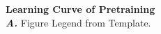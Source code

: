 \caption{\textbf{
Learning Curve of Pretraining
}
\smallskip
\\
\textbf{\textit{A.}} Figure Legend from Template.
}
